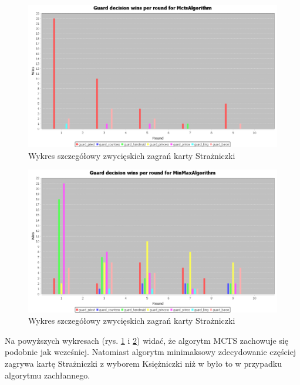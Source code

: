 \begin{figure}[H]
	\centering
	\includegraphics[width=\textwidth]{Resources/MirrorMmVsMcts/MctsVsMmGuardDecision.PNG}
	\caption{Wykres szczegółowy zwycięskich zagrań karty Strażniczki} 
	\label{fig:MctsVsMmGuardDecision}
\end{figure}

\begin{figure}[H]
	\centering
	\includegraphics[width=\textwidth]{Resources/MirrorMmVsMcts/MmVsMctsGuardDecision.PNG}
	\caption{Wykres szczegółowy zwycięskich zagrań karty Strażniczki} 
	\label{fig:MmVsMctsGuardDecision}
\end{figure}

Na powyższych wykresach (rys. \ref{fig:MctsVsMmGuardDecision} i \ref{fig:MmVsMctsGuardDecision}) widać, że algorytm MCTS zachowuje się podobnie jak wcześniej. Natomiast algorytm minimaksowy zdecydowanie częściej zagrywa kartę Strażniczki z wyborem Księżniczki niż w było to w przypadku algorytmu zachłannego.

